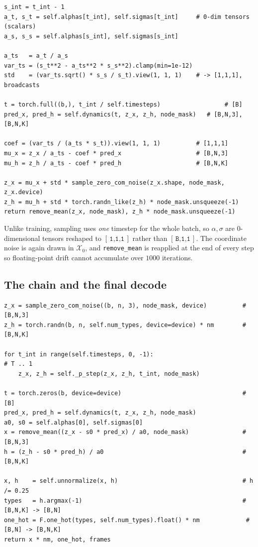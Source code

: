 \documentclass[11pt,a4paper]{article}
\newcommand{\shape}[1]{\ensuremath{[\,\texttt{#1}\,]}}
\newcommand{\code}[1]{\texttt{#1}}
\newcommand{\bz}{\mathbf{z}}
\begin{document}
\begin{lstlisting}[caption={\code{\_p\_step} --- one ancestral step $\bz_t\to\bz_{t-1}$}]
s_int = t_int - 1
a_t, s_t = self.alphas[t_int], self.sigmas[t_int]     # 0-dim tensors (scalars)
a_s, s_s = self.alphas[s_int], self.sigmas[s_int]

a_ts   = a_t / a_s
var_ts = (s_t**2 - a_ts**2 * s_s**2).clamp(min=1e-12)
std    = (var_ts.sqrt() * s_s / s_t).view(1, 1, 1)    # -> [1,1,1], broadcasts

t = torch.full((b,), t_int / self.timesteps)                  # [B]
pred_x, pred_h = self.dynamics(t, z_x, z_h, node_mask)   # [B,N,3], [B,N,K]

coef = (var_ts / (a_ts * s_t)).view(1, 1, 1)          # [1,1,1]
mu_x = z_x / a_ts - coef * pred_x                     # [B,N,3]
mu_h = z_h / a_ts - coef * pred_h                     # [B,N,K]

z_x = mu_x + std * sample_zero_com_noise(z_x.shape, node_mask, z_x.device)
z_h = mu_h + std * torch.randn_like(z_h) * node_mask.unsqueeze(-1)
return remove_mean(z_x, node_mask), z_h * node_mask.unsqueeze(-1)
\end{lstlisting}

\noindent
Unlike training, sampling uses \emph{one} timestep for the whole batch, so
$\alpha,\sigma$ are $0$-dimensional tensors reshaped to \shape{1,1,1} rather
than \shape{B,1,1}. The coordinate noise is again drawn in $\mathcal{X}_0$, and
\code{remove\_mean} is reapplied at the end of every step so floating-point
drift cannot accumulate over $1000$ iterations.

\subsection{The chain and the final decode}

\begin{lstlisting}[caption={\code{sample} --- the full reverse trajectory}]
z_x = sample_zero_com_noise((b, n, 3), node_mask, device)          # [B,N,3]
z_h = torch.randn(b, n, self.num_types, device=device) * nm        # [B,N,K]

for t_int in range(self.timesteps, 0, -1):                                 # T .. 1
    z_x, z_h = self._p_step(z_x, z_h, t_int, node_mask)

t = torch.zeros(b, device=device)                                  # [B]
pred_x, pred_h = self.dynamics(t, z_x, z_h, node_mask)
a0, s0 = self.alphas[0], self.sigmas[0]
x = remove_mean((z_x - s0 * pred_x) / a0, node_mask)               # [B,N,3]
h = (z_h - s0 * pred_h) / a0                                       # [B,N,K]

x, h    = self.unnormalize(x, h)                                   # h /= 0.25
types   = h.argmax(-1)                                             # [B,N,K] -> [B,N]
one_hot = F.one_hot(types, self.num_types).float() * nm             # [B,N] -> [B,N,K]
return x * nm, one_hot, frames
\end{lstlisting}
\end{document}

